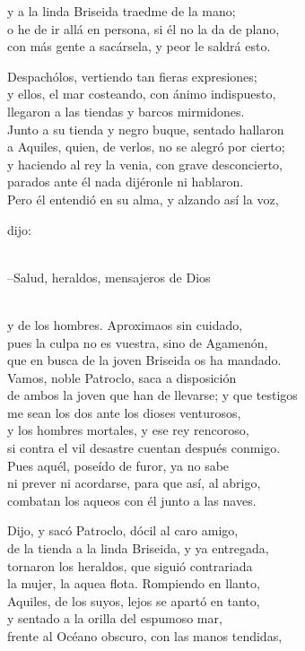 \documentclass[11pt,twoside]{article}
\newcommand{\dlgo}[2]{\sbox{\dbox}{#1}\parbox[t]{\linewidth}{#1\strut\\[0pt]\hspace*{\wd\dbox}\hspace{\fontdimen2\font}#2\strut}}
\begin{document}
y a la linda Briseida traedme de la mano;\\
o he de ir allá en persona, si él no la da de plano,\\
con más gente a sacársela, y peor le saldrá esto.\par
Despachólos, vertiendo tan fieras expresiones;\\
y ellos, el mar costeando, con ánimo indispuesto,\\
llegaron a las tiendas y barcos mirmidones.\\
Junto a su tienda y negro buque, sentado hallaron\\
a Aquiles, quien, de verlos, no se alegró por cierto;\\
y haciendo al rey la venia, con grave desconcierto,\\
parados ante él nada dijéronle ni hablaron.\\
Pero él entendió en su alma, y alzando así la voz,\\
\dlgo{dijo:}{--Salud, heraldos, mensajeros de Dios}\\
y de los hombres. Aproximaos sin cuidado,\\
pues la culpa no es vuestra, sino de Agamenón,\\
que en busca de la joven Briseida os ha mandado.\\
Vamos, noble Patroclo, saca a disposición\\
de ambos la joven que han de llevarse; y que testigos\\
me sean los dos ante los dioses venturosos,\\
y los hombres mortales, y ese rey rencoroso,\\
si contra el vil desastre cuentan después conmigo.\\
Pues aquél, poseído de furor, ya no sabe\\
ni prever ni acordarse, para que así, al abrigo,\\
combatan los aqueos con él junto a las naves.\par
Dijo, y sacó Patroclo, dócil al caro amigo,\\
de la tienda a la linda Briseida, y ya entregada,\\
tornaron los heraldos, que siguió contrariada\\
la mujer, la aquea flota. Rompiendo en llanto,\\
Aquiles, de los suyos, lejos se apartó en tanto,\\
y sentado a la orilla del espumoso mar,\\
frente al Océano obscuro, con las manos tendidas,\\
\end{document}

